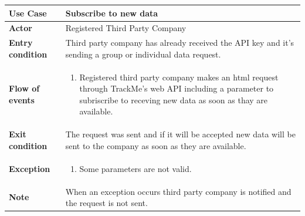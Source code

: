 \documentclass[../main.tex]{subfiles}
\begin{document}
	\begin{center}
		\begin{tabular}{p{3cm}p{8.28cm}}
			\hline
			\textbf{Use Case} & Subscribe to new data\\
			\hline
			\textbf{Actor} & Registered Third Party Company\\
			\hline
			\textbf{Entry condition} & Third party company has already received the API key and it's sending a group or individual data request.\\
			\hline
			\textbf{Flow of events} & \begin{enumerate}
				\linespread{0}\item Registered third party company makes an html request through TrackMe's web API including a parameter to subriscribe to receving new data as soon as thay are available.
			\end{enumerate}\\
			\hline
			\textbf{Exit condition} & The request was sent and if it will be accepted new data will be sent to the company as soon as they are available.\\
			\hline
			\textbf{Exception} & \begin{enumerate}
				\linespread{0}\item Some parameters are not valid.
			\end{enumerate}\\
			\hline
			\textbf{Note} & When an exception occurs third party company is notified and the request is not sent.\\
			\hline
		\end{tabular}
	\end{center}
	\vspace{1cm}
\end{document}
